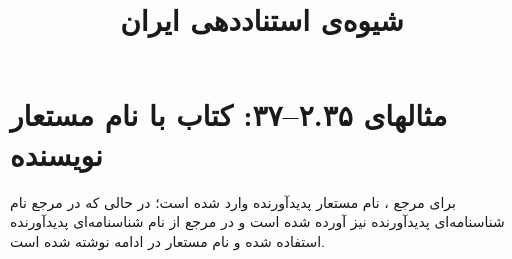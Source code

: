 \documentclass[a4paper,10pt]{article}
\begin{document}
\title{شیوه‌ی استناددهی ایران
 }
\author{}
\date{}
\maketitle



\section*{مثالهای ۲.۳۵--۳۷: کتاب با نام مستعار نویسنده}

برای مرجع \cite{یوشیج1383a}، نام مستعار پدیدآورنده وارد شده است؛ در حالی که در مرجع \cite{یوشیج1383b} نام شناسنا‌مه‌ای پدیدآورنده نیز آورده شده است و در مرجع \cite{اسفندیاری1383} از نام شناسنامه‌ای پدیدآورنده استفاده شده و نام مستعار در ادامه نوشته شده است.






\end{document}
